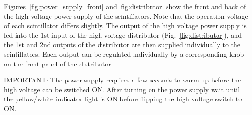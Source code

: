 \documentclass[12pt]{article}
\begin{document}
Figures~\ref{fig:power_supply_front} and \ref{fig:distributor} show the front and back of the high voltage power supply of the scintillators. Note that the operation voltage of each scintillator differs slightly. The output of the high voltage power supply is fed into the 1st input of the high voltage distributor (Fig.~\ref{fig:distributor}), and the 1st and 2nd outputs of the distributor are then supplied individually to the scintillators. Each output can be regulated individually by a corresponding knob on the front panel of the distributor.

IMPORTANT: The power supply requires a few seconds to warm up before the high voltage can be switched ON. After turning on the power supply wait until the yellow/white indicator light is ON before flipping the high voltage switch to ON.
\end{document}
